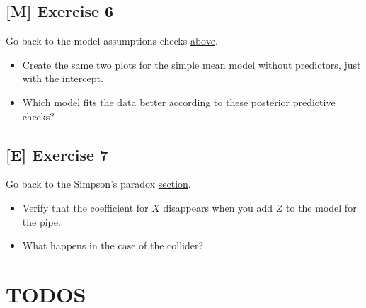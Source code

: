 \documentclass[
]{book}
\providecommand{\tightlist}{%
  \setlength{\itemsep}{0pt}\setlength{\parskip}{0pt}}
\begin{document}
\subsection{{[}M{]} Exercise 6}\label{exercise6_multiple_regression}

Go back to the model assumptions checks \hyperref[check_model_bayes]{above}.

\begin{itemize}
\tightlist
\item
  Create the same two plots for the simple mean model without predictors, just with the intercept.
\item
  Which model fits the data better according to these posterior predictive checks?
\end{itemize}

\subsection{{[}E{]} Exercise 7}\label{exercise7_multiple_regression}

Go back to the Simpson's paradox \hyperref[simpsons_paradox]{section}.

\begin{itemize}
\tightlist
\item
  Verify that the coefficient for \(X\) disappears when you add \(Z\) to the model for the pipe.
\item
  What happens in the case of the collider?
\end{itemize}

\section{TODOS}\label{todos}
\end{document}
